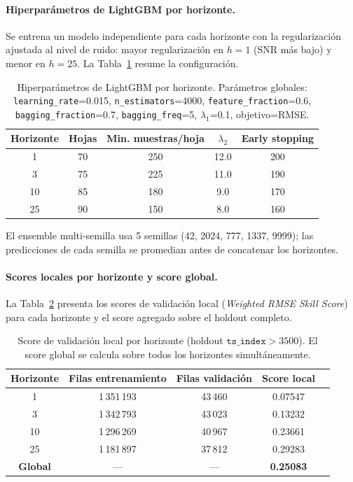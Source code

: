 \documentclass{article}
\begin{document}
\paragraph{Hiperparámetros de LightGBM por horizonte.}
Se entrena un modelo independiente para cada horizonte con la regularización ajustada al nivel de ruido: mayor regularización en $h=1$ (SNR más bajo) y menor en $h=25$. La Tabla~\ref{tab:lgb_params} resume la configuración.

\begin{table}[h!]
  \caption{Hiperparámetros de LightGBM por horizonte. Parámetros globales: \texttt{learning\_rate}=0.015, \texttt{n\_estimators}=4000, \texttt{feature\_fraction}=0.6, \texttt{bagging\_fraction}=0.7, \texttt{bagging\_freq}=5, $\lambda_1$=0.1, objetivo=RMSE.}
  \label{tab:lgb_params}
  \centering
  \begin{tabular}{ccccc}
    \toprule
    Horizonte & Hojas & Min. muestras/hoja & $\lambda_2$ & Early stopping \\
    \midrule
    1  & 70 & 250 & 12.0 & 200 \\
    3  & 75 & 225 & 11.0 & 190 \\
    10 & 85 & 180 &  9.0 & 170 \\
    25 & 90 & 150 &  8.0 & 160 \\
    \bottomrule
  \end{tabular}
\end{table}

El ensemble multi-semilla usa 5 semillas (42, 2024, 777, 1337, 9999); las predicciones de cada semilla se promedian antes de concatenar los horizontes.

\paragraph{Scores locales por horizonte y score global.}
La Tabla~\ref{tab:horizon_scores} presenta los scores de validación local (\emph{Weighted RMSE Skill Score}) para cada horizonte y el score agregado sobre el holdout completo.

\begin{table}[h!]
  \caption{Score de validación local por horizonte (holdout $\texttt{ts\_index} > 3500$). El score global se calcula sobre todos los horizontes simultáneamente.}
  \label{tab:horizon_scores}
  \centering
  \begin{tabular}{ccccc}
    \toprule
    Horizonte & Filas entrenamiento & Filas validación & Score local \\
    \midrule
    1  & 1\,351\,193 & 43\,460 & 0.07547 \\
    3  & 1\,342\,793 & 43\,023 & 0.13232 \\
    10 & 1\,296\,269 & 40\,967 & 0.23661 \\
    25 & 1\,181\,897 & 37\,812 & 0.29283 \\
    \midrule
    \textbf{Global} & --- & --- & \textbf{0.25083} \\
    \bottomrule
  \end{tabular}
\end{table}
\end{document}
